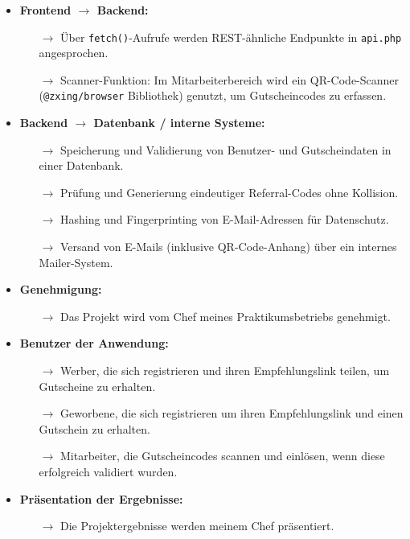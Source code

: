 \begin{itemize}
    \item \textbf{Frontend $\longrightarrow$ Backend:}
          \begin{itemize}
              \item[$\rightarrow$] Über \texttt{fetch()}-Aufrufe werden REST-ähnliche Endpunkte in \texttt{api.php} angesprochen.
              \item[$\rightarrow$] Scanner-Funktion: Im Mitarbeiterbereich wird ein QR-Code-Scanner (\texttt{@zxing/browser} Bibliothek) genutzt, um Gutscheincodes zu erfassen.
          \end{itemize}

    \item \textbf{Backend $\longrightarrow$ Datenbank / interne Systeme:}
          \begin{itemize}
              \item[$\rightarrow$] Speicherung und Validierung von Benutzer- und Gutscheindaten in einer Datenbank.
              \item[$\rightarrow$] Prüfung und Generierung eindeutiger Referral-Codes ohne Kollision.
              \item[$\rightarrow$] Hashing und Fingerprinting von E-Mail-Adressen für Datenschutz.
              \item[$\rightarrow$] Versand von E-Mails (inklusive QR-Code-Anhang) über ein internes Mailer-System.
          \end{itemize}

    \item \textbf{Genehmigung:}
          \begin{itemize}
              \item[$\rightarrow$] Das Projekt wird vom Chef meines Praktikumsbetriebs genehmigt.
          \end{itemize}

    \item \textbf{Benutzer der Anwendung:}
          \begin{itemize}
              \item[$\rightarrow$] Werber, die sich registrieren und ihren Empfehlungslink teilen, um Gutscheine zu erhalten.
              \item[$\rightarrow$] Geworbene, die sich registrieren um ihren Empfehlungslink und einen Gutschein zu erhalten.
              \item[$\rightarrow$] Mitarbeiter, die Gutscheincodes scannen und einlösen, wenn diese erfolgreich validiert wurden.
          \end{itemize}

    \item \textbf{Präsentation der Ergebnisse:}
          \begin{itemize}
              \item[$\rightarrow$] Die Projektergebnisse werden meinem Chef präsentiert.
          \end{itemize}
\end{itemize}

